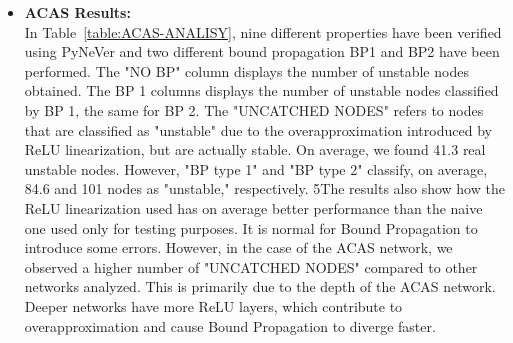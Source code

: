 \begin{itemize}
    \item \textbf{ACAS Results:}\\
    In Table~\ref{table:ACAS-ANALISY}, nine different properties have been verified using PyNeVer and two different bound propagation BP1 and BP2 have been performed. The "NO BP" column displays the number of unstable nodes obtained. 
    The BP 1 columns displays the number of unstable nodes classified by BP 1, the same for BP 2.
    The "UNCATCHED NODES" refers to nodes that are classified as "unstable" due to the overapproximation introduced by ReLU linearization, but are actually stable. On average, we found 41.3 real unstable nodes. 
    However, "BP type 1" and "BP type 2" classify, on average, 84.6 and 101 nodes as "unstable," respectively. 5The results also show how the ReLU linearization used has on average better performance than the naive one used only for testing purposes.
    It is normal for Bound Propagation to introduce some errors. However, in the case of the ACAS network, we observed a higher number of "UNCATCHED NODES" compared to other networks analyzed. This is primarily due to the depth of the ACAS network. Deeper networks have more ReLU layers, which contribute to overapproximation and cause Bound Propagation to diverge faster.
   

\end{itemize}
